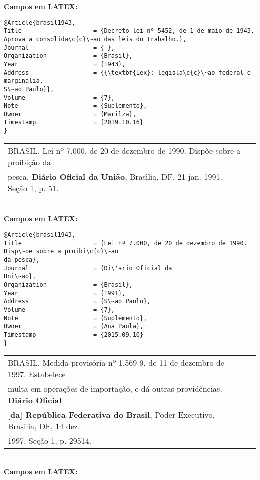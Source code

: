 \textbf{Campos em LATEX:} 

\begin{verbatim}
@Article{brasil1943,
Title                    = {Decreto-lei nº 5452, de 1 de maio de 1943. 
Aprova a consolida\c{c}\~ao das leis do trabalho.},
Journal                  = { },
Organization             = {Brasil},
Year                     = {1943},
Address                  = {{\textbf{Lex}: legisla\c{c}\~ao federal e marginalia, 
S\~ao Paulo}},
Volume                   = {7},
Note                     = {Suplemento},
Owner                    = {Marilza},
Timestamp                = {2019.10.16}
}
\end{verbatim}

\begin{tabular}{|l|c|} \hline
	BRASIL. Lei nº 7.000, de 20 de dezembro de 1990. Disp\~oe sobre a proibi\c{c}\~ao
	da \\ pesca. \textbf{Di\'ario Oficial da Uni\~ao}, Bras\'{\i}lia, DF, 21 jan. 1991. Se\c{c}\~ao 1, p. 51.
	\\\hline
\end{tabular} \\

\textbf{Campos em LATEX:} 

\begin{verbatim}
@Article{brasil1943,
Title                    = {Lei nº 7.000, de 20 de dezembro de 1990. 
Disp\~oe sobre a proibi\c{c}\~ao
da pesca},
Journal                  = {Di\'ario Oficial da
Uni\~ao},
Organization             = {Brasil},
Year                     = {1991},
Address                  = {S\~ao Paulo},
Volume                   = {7},
Note                     = {Suplemento},
Owner                    = {Ana Paula},
Timestamp                = {2015.09.10}
}
\end{verbatim}

\begin{tabular}{|l|c|} \hline
	BRASIL. Medida provis\'oria nº 1.569-9, de 11 de dezembro de 1997.
	Estabelece \\ multa em opera\c{c}\~oes de importa\c{c}\~ao, e d\'a outras provid\^encias.
	\textbf{Di\'ario Oficial} \\ \textbf{[da] Rep\'ublica Federativa do Brasil}, Poder Executivo,
	Bras\'{\i}lia, DF, 14 dez.\\
	1997. Se\c{c}\~ao 1, p. 29514. \\\hline
\end{tabular} \\

\textbf{Campos em LATEX:} 

